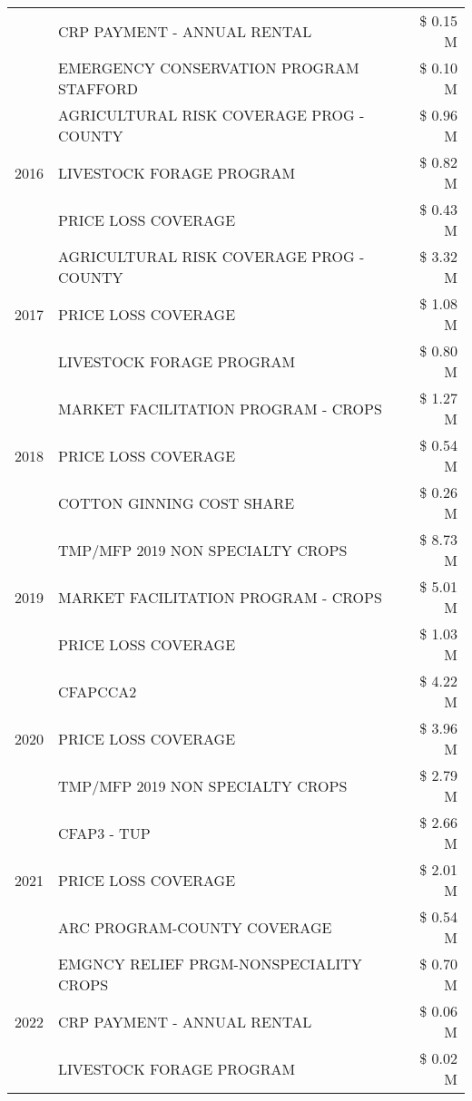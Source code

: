 \begin{tabular}{llr}
 & CRP PAYMENT - ANNUAL RENTAL & \$ 0.15 M \\
 & EMERGENCY CONSERVATION PROGRAM STAFFORD & \$ 0.10 M \\
\cline{1-3}
\multirow[t]{3}{*}{2016} & AGRICULTURAL RISK COVERAGE PROG - COUNTY & \$ 0.96 M \\
 & LIVESTOCK FORAGE PROGRAM & \$ 0.82 M \\
 & PRICE LOSS COVERAGE & \$ 0.43 M \\
\cline{1-3}
\multirow[t]{3}{*}{2017} & AGRICULTURAL RISK COVERAGE PROG - COUNTY & \$ 3.32 M \\
 & PRICE LOSS COVERAGE & \$ 1.08 M \\
 & LIVESTOCK FORAGE PROGRAM & \$ 0.80 M \\
\cline{1-3}
\multirow[t]{3}{*}{2018} & MARKET FACILITATION PROGRAM - CROPS & \$ 1.27 M \\
 & PRICE LOSS COVERAGE & \$ 0.54 M \\
 & COTTON GINNING COST SHARE & \$ 0.26 M \\
\cline{1-3}
\multirow[t]{3}{*}{2019} & TMP/MFP 2019 NON SPECIALTY CROPS & \$ 8.73 M \\
 & MARKET FACILITATION PROGRAM - CROPS & \$ 5.01 M \\
 & PRICE LOSS COVERAGE & \$ 1.03 M \\
\cline{1-3}
\multirow[t]{3}{*}{2020} & CFAPCCA2 & \$ 4.22 M \\
 & PRICE LOSS COVERAGE & \$ 3.96 M \\
 & TMP/MFP 2019 NON SPECIALTY CROPS & \$ 2.79 M \\
\cline{1-3}
\multirow[t]{3}{*}{2021} & CFAP3 - TUP & \$ 2.66 M \\
 & PRICE LOSS COVERAGE & \$ 2.01 M \\
 & ARC PROGRAM-COUNTY COVERAGE & \$ 0.54 M \\
\cline{1-3}
\multirow[t]{3}{*}{2022} & EMGNCY RELIEF PRGM-NONSPECIALITY CROPS & \$ 0.70 M \\
 & CRP PAYMENT - ANNUAL RENTAL & \$ 0.06 M \\
 & LIVESTOCK FORAGE PROGRAM & \$ 0.02 M \\
\cline{1-3}
\bottomrule
\end{tabular}
